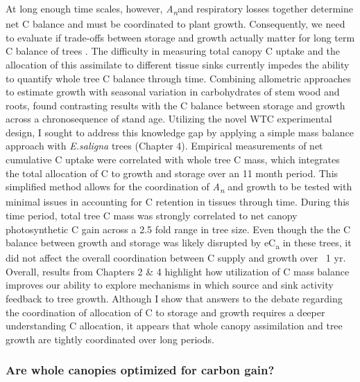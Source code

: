 \documentclass[a4paper]{article}
\begin{document}
At long enough time scales, however, \textit{A\textsubscript{n}}and respiratory losses together determine net C balance and must be coordinated to plant growth. Consequently, we need to evaluate if trade-offs between storage and growth actually matter for long term C balance of trees \citep{palacio2014does}. The difficulty in measuring total canopy C uptake and the allocation of this assimilate to different tissue sinks currently impedes the ability to quantify whole tree C balance through time. Combining allometric approaches to estimate growth with seasonal variation in carbohydrates of stem wood and roots, \citet{genet2010age} found contrasting results with the C balance between storage and growth across a chronosequence of stand age. Utilizing the novel WTC experimental design, I sought to address this knowledge gap by applying a simple mass balance approach with \textit{E.saligna} trees (Chapter 4). Empirical measurements of net cumulative C uptake were correlated with whole tree C mass, which integrates the total allocation of C to growth and storage over an 11 month period. This simplified method allows for the coordination of \textit{A\textsubscript{n}} and growth to be tested with minimal issues in accounting for C retention in tissues through time. During this time period, total tree C mass was strongly correlated to net canopy photosynthetic C gain across a 2.5 fold range in tree size. Even though the the C balance between growth and storage was likely disrupted by eC\textsubscript{a} in these trees, it did not affect the overall coordination between C supply and growth over ~1 yr. Overall, results from Chapters 2 \& 4 highlight how utilization of C mass balance improves our ability to explore mechanisms in which source and sink activity feedback to tree growth. Although I show that answers to the debate regarding the coordination of allocation of C to storage and growth requires a deeper understanding C allocation, it appears that whole canopy assimilation and tree growth are tightly coordinated over long periods.

\subsubsection*{Are whole canopies optimized for carbon gain?}
\end{document}
